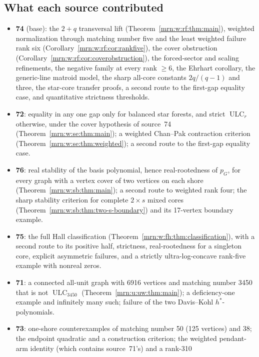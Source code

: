 \documentclass[11pt,a4paper]{article}
\theoremstyle{remark}\newtheorem{remark}[theorem]{Remark}
\newcommand{\ULC}{\operatorname{ULC}}      %
\begin{document}
\subsection{What each source contributed}\label{mrn:sec:contrib}
\begin{itemize}
\item \textbf{74} (base): the $2+q$ transversal lift
  (Theorem~\ref{mrn:w:rf:thm:main}), weighted normalization through matching
  number five and the least weighted failure rank six
  (Corollary~\ref{mrn:w:rf:cor:rankfive}), the cover obstruction
  (Corollary~\ref{mrn:w:rf:cor:coverobstruction}), the forced-sector and
  scaling refinements, the negative family at every rank $\ge6$, the Ehrhart
  corollary, the generic-line matroid model, the sharp all-core constants
  $2q/(q-1)$ and three, the star-core transfer proofs, a second route to the
  first-gap equality case, and quantitative strictness thresholds.
\item \textbf{72}: equality in any one gap only for balanced star forests,
  and strict $\ULC_r$ otherwise, under the cover hypothesis of source~74
  (Theorem~\ref{mrn:w:se:thm:main}); a weighted Chan--Pak contraction
  criterion (Theorem~\ref{mrn:w:se:thm:weighted}); a second route to the
  first-gap equality case.
\item \textbf{76}: real stability of the basis polynomial, hence
  real-rootedness of $p_G$, for every graph with a vertex cover of two
  vertices on each shore (Theorem~\ref{mrn:w:sb:thm:main}); a second route to
  weighted rank four; the sharp stability criterion for complete $2\times s$
  mixed cores (Theorem~\ref{mrn:w:sb:thm:two-s-boundary}) and its 17-vertex
  boundary example.
\item \textbf{75}: the full Hall classification
  (Theorem~\ref{mrn:w:fh:thm:classification}), with a second route to its
  positive half, strictness, real-rootedness for a singleton core, explicit
  asymmetric failures, and a strictly ultra-log-concave rank-five example
  with nonreal zeros.
\item \textbf{71}: a connected all-unit graph with 6916 vertices and matching
  number 3450 that is not $\ULC_{3450}$ (Theorem~\ref{mrn:u:uw:thm:main}); a
  deficiency-one example and infinitely many such; failure of the two
  Davis--Kohl $h^*$-polynomials.
\item \textbf{73}: one-shore counterexamples of matching number 50 (125
  vertices) and 38; the endpoint quadratic and a construction criterion; the
  weighted pendant-arm identity (which contains source~71's) and a rank-310

\end{itemize}
\end{document}
